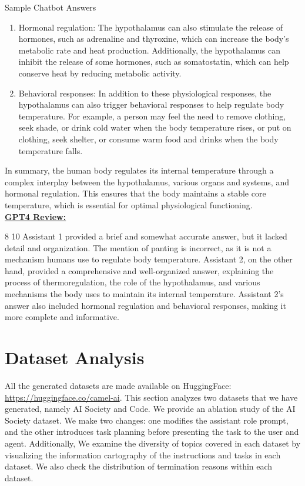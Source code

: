 \begin{AIBox}{Sample Chatbot Answers}
\begin{enumerate}
		\item  Hormonal regulation: The hypothalamus can also stimulate the release of hormones, such as adrenaline and thyroxine, which can increase the body's metabolic rate and heat production. Additionally, the hypothalamus can inhibit the release of some hormones, such as somatostatin, which can help conserve heat by reducing metabolic activity.

		\item  Behavioral responses: In addition to these physiological responses, the hypothalamus can also trigger behavioral responses to help regulate body temperature. For example, a person may feel the need to remove clothing, seek shade, or drink cold water when the body temperature rises, or put on clothing, seek shelter, or consume warm food and drinks when the body temperature falls.
	\end{enumerate}

	In summary, the human body regulates its internal temperature through a complex interplay between the hypothalamus, various organs and systems, and hormonal regulation. This ensures that the body maintains a stable core temperature, which is essential for optimal physiological functioning.\\

	\textbf{\underline{GPT4 Review:}}

	8 10
	Assistant 1 provided a brief and somewhat accurate answer, but it lacked detail and organization. The mention of panting is incorrect, as it is not a mechanism humans use to regulate body temperature. Assistant 2, on the other hand, provided a comprehensive and well-organized answer, explaining the process of thermoregulation, the role of the hypothalamus, and various mechanisms the body uses to maintain its internal temperature. Assistant 2's answer also included hormonal regulation and behavioral responses, making it more complete and informative.

\end{AIBox}



\clearpage

\section{Dataset Analysis}

All the generated datasets are made available on HuggingFace: \url{https://huggingface.co/camel-ai}. This section analyzes two datasets that we have generated, namely AI Society and Code. We provide an ablation study of the AI Society dataset. We make two changes: one modifies the assistant role prompt, and the other introduces task planning before presenting the task to the user and agent. Additionally, We examine the diversity of topics covered in each dataset by visualizing the information cartography of the instructions and tasks in each dataset. We also check the distribution of termination reasons within each dataset.

